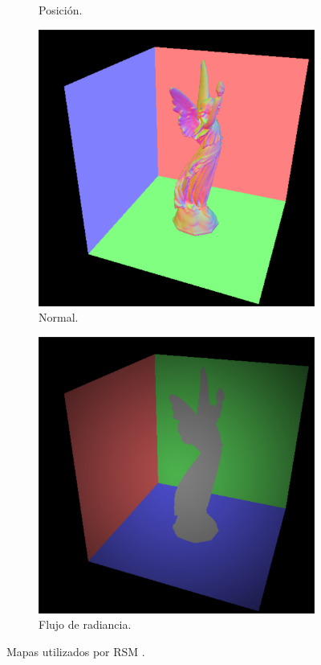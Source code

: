 \begin{figure}[H]
\begin{subfigure}[t]{.24\linewidth}
		\caption*{Posición.}
	\end{subfigure}
	\begin{subfigure}[t]{.24\linewidth}
		\centering
		\captionsetup{justification=centering}
		\includegraphics[width=\linewidth]{media/rsmn.png}
		\caption*{Normal.}
	\end{subfigure}
	\begin{subfigure}[t]{.24\linewidth}
		\centering
		\captionsetup{justification=centering}
		\includegraphics[width=\linewidth]{media/rsmf.png}
		\caption*{Flujo de radiancia.}
	\end{subfigure}
	\caption{Mapas utilizados por \ac{RSM} \cite{Dachsbacher:2005}.}
	\label{fig:rsm_fbo}
\end{figure}

